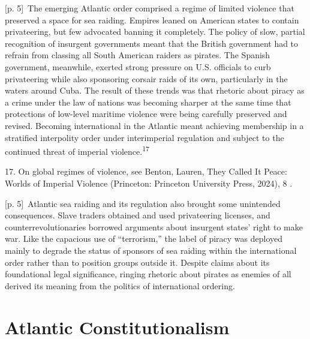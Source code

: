 \documentclass[10pt,a4paper]{article}
\begin{document}
{\scriptsize\color{gray} [p. 5]}\ The emerging Atlantic order comprised a regime of limited violence that preserved a space for sea raiding. Empires leaned on American states to contain privateering, but few advocated banning it completely. The policy of slow, partial recognition of insurgent governments meant that the British government had to refrain from classing all South American raiders as pirates. The Spanish government, meanwhile, exerted strong pressure on U.S. officials to curb privateering while also sponsoring corsair raids of its own, particularly in the waters around Cuba. The result of these trends was that rhetoric about piracy as a crime under the law of nations was becoming sharper at the same time that protections of low-level maritime violence were being carefully preserved and revised. Becoming international in the Atlantic meant achieving membership in a stratified interpolity order under interimperial regulation and subject to the continued threat of imperial violence.\nobreak\textsuperscript{17}\par{\small 17. On global regimes of violence, see Benton, Lauren, They Called It Peace: Worlds of Imperial Violence (Princeton: Princeton University Press, 2024), 8 .\par}
{\scriptsize\color{gray} [p. 5]}\ Atlantic sea raiding and its regulation also brought some unintended consequences. Slave traders obtained and used privateering licenses, and counterrevolutionaries borrowed arguments about insurgent states’ right to make war. Like the capacious use of “terrorism,” the label of piracy was deployed mainly to degrade the status of sponsors of sea raiding within the international order rather than to position groups outside it. Despite claims about its foundational legal significance, ringing rhetoric about pirates as enemies of all derived its meaning from the politics of international ordering.\par
{}\section*{Atlantic Constitutionalism}
\end{document}
